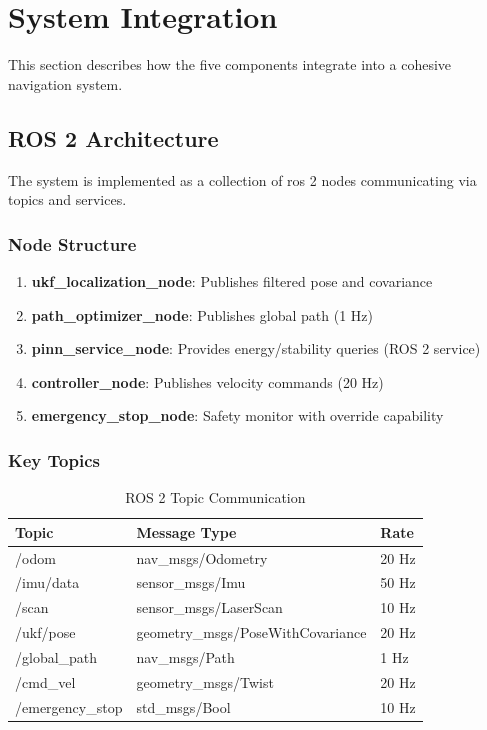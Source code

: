 
\section{System Integration}
\label{sec:meth_integration}

This section describes how the five components integrate into a cohesive navigation system.

\subsection{ROS 2 Architecture}

The system is implemented as a collection of \acrshort{ros} 2 nodes communicating via topics and services.

\subsubsection{Node Structure}

\begin{enumerate}
    \item \textbf{ukf\_localization\_node}: Publishes filtered pose and covariance
    \item \textbf{path\_optimizer\_node}: Publishes global path (1 Hz)
    \item \textbf{pinn\_service\_node}: Provides energy/stability queries (ROS 2 service)
    \item \textbf{controller\_node}: Publishes velocity commands (20 Hz)
    \item \textbf{emergency\_stop\_node}: Safety monitor with override capability
\end{enumerate}

\subsubsection{Key Topics}

\begin{table}[h]
\centering
\caption{ROS 2 Topic Communication}
\label{tab:ros2_topics}
\begin{tabular}{lll}
\toprule
\textbf{Topic} & \textbf{Message Type} & \textbf{Rate} \\
\midrule
/odom & nav\_msgs/Odometry & 20 Hz \\
/imu/data & sensor\_msgs/Imu & 50 Hz \\
/scan & sensor\_msgs/LaserScan & 10 Hz \\
/ukf/pose & geometry\_msgs/PoseWithCovariance & 20 Hz \\
/global\_path & nav\_msgs/Path & 1 Hz \\
/cmd\_vel & geometry\_msgs/Twist & 20 Hz \\
/emergency\_stop & std\_msgs/Bool & 10 Hz \\
\bottomrule
\end{tabular}
\end{table}

